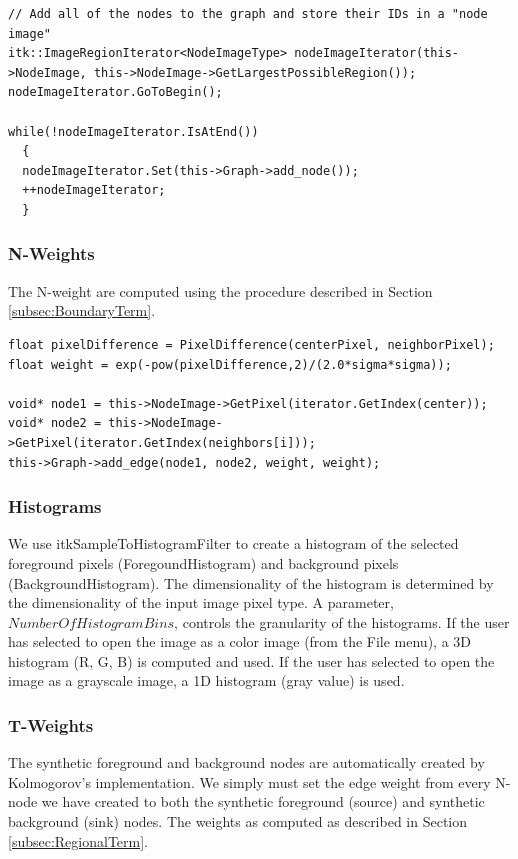 \documentclass{InsightArticle}
\begin{document}
\begin{verbatim}
// Add all of the nodes to the graph and store their IDs in a "node image"
itk::ImageRegionIterator<NodeImageType> nodeImageIterator(this->NodeImage, this->NodeImage->GetLargestPossibleRegion());
nodeImageIterator.GoToBegin();

while(!nodeImageIterator.IsAtEnd())
  {
  nodeImageIterator.Set(this->Graph->add_node());
  ++nodeImageIterator;
  }
\end{verbatim}


\subsubsection{N-Weights}
The N-weight are computed using the procedure described in Section \ref{subsec:BoundaryTerm}.

\begin{verbatim}
float pixelDifference = PixelDifference(centerPixel, neighborPixel);
float weight = exp(-pow(pixelDifference,2)/(2.0*sigma*sigma));

void* node1 = this->NodeImage->GetPixel(iterator.GetIndex(center));
void* node2 = this->NodeImage->GetPixel(iterator.GetIndex(neighbors[i]));
this->Graph->add_edge(node1, node2, weight, weight);
\end{verbatim}

\subsubsection{Histograms}
We use itkSampleToHistogramFilter to create a histogram of the selected foreground pixels (ForegoundHistogram) and background pixels (BackgroundHistogram). The dimensionality of the histogram is determined by the dimensionality of the input image pixel type. A parameter, $NumberOfHistogramBins$, controls the granularity of the histograms. If the user has selected to open the image as a color image (from the File menu), a 3D histogram (R, G, B) is computed and used. If the user has selected to open the image as a grayscale image, a 1D histogram (gray value) is used.

\subsubsection{T-Weights}
The synthetic foreground and background nodes are automatically created by Kolmogorov's implementation. We simply must set the edge weight from every N-node we have created to both the synthetic foreground (source) and synthetic background (sink) nodes. The weights as computed as described in Section \ref{subsec:RegionalTerm}.
\end{document}
